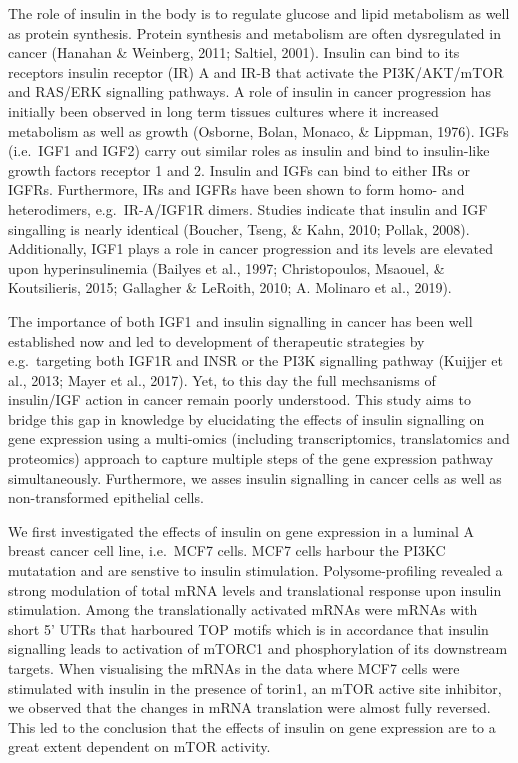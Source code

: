 \documentclass[12pt,openany]{book}
\begin{document}
The role of insulin in the body is to regulate glucose and lipid
metabolism as well as protein synthesis. Protein synthesis and
metabolism are often dysregulated in cancer (Hanahan \& Weinberg, 2011;
Saltiel, 2001). Insulin can bind to its receptors insulin receptor (IR)
A and IR-B that activate the PI3K/AKT/mTOR and RAS/ERK signalling
pathways. A role of insulin in cancer progression has initially been
observed in long term tissues cultures where it increased metabolism as
well as growth (Osborne, Bolan, Monaco, \& Lippman, 1976). IGFs
(i.e.~IGF1 and IGF2) carry out similar roles as insulin and bind to
insulin-like growth factors receptor 1 and 2. Insulin and IGFs can bind
to either IRs or IGFRs. Furthermore, IRs and IGFRs have been shown to
form homo- and heterodimers, e.g.~IR-A/IGF1R dimers. Studies indicate
that insulin and IGF singalling is nearly identical (Boucher, Tseng, \&
Kahn, 2010; Pollak, 2008). Additionally, IGF1 plays a role in cancer
progression and its levels are elevated upon hyperinsulinemia (Bailyes
et al., 1997; Christopoulos, Msaouel, \& Koutsilieris, 2015; Gallagher
\& LeRoith, 2010; A. Molinaro et al., 2019).

The importance of both IGF1 and insulin signalling in cancer has been
well established now and led to development of therapeutic strategies by
e.g.~targeting both IGF1R and INSR or the PI3K signalling pathway
(Kuijjer et al., 2013; Mayer et al., 2017). Yet, to this day the full
mechsanisms of insulin/IGF action in cancer remain poorly understood.
This study aims to bridge this gap in knowledge by elucidating the
effects of insulin signalling on gene expression using a multi-omics
(including transcriptomics, translatomics and proteomics) approach to
capture multiple steps of the gene expression pathway simultaneously.
Furthermore, we asses insulin signalling in cancer cells as well as
non-transformed epithelial cells.

We first investigated the effects of insulin on gene expression in a
luminal A breast cancer cell line, i.e.~MCF7 cells. MCF7 cells harbour
the PI3KC mutatation and are senstive to insulin stimulation.
Polysome-profiling revealed a strong modulation of total mRNA levels and
translational response upon insulin stimulation. Among the
translationally activated mRNAs were mRNAs with short 5' UTRs that
harboured TOP motifs which is in accordance that insulin signalling
leads to activation of mTORC1 and phosphorylation of its downstream
targets. When visualising the mRNAs in the data where MCF7 cells were
stimulated with insulin in the presence of torin1, an mTOR active site
inhibitor, we observed that the changes in mRNA translation were almost
fully reversed. This led to the conclusion that the effects of insulin
on gene expression are to a great extent dependent on mTOR activity.
\end{document}
